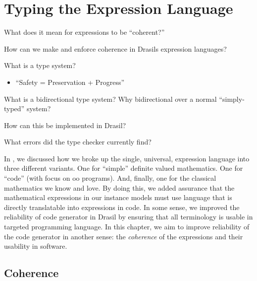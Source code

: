\chapter{Typing the Expression Language}
\label{chap:typedExpr}

\begin{writingdirectives}
      \item What does it mean for expressions to be ``coherent?''
      \item How can we make and enforce coherence in Drasils expression
            languages?
      \item What is a type system?
            \begin{itemize}
                  \item ``Safety = Preservation + Progress'' \cite{Harper2016}
            \end{itemize}
      \item What is a bidirectional type system? Why bidirectional over a normal
            ``simply-typed'' system?
      \item How can this be implemented in Drasil?
      \item What errors did the type checker currently find?
\end{writingdirectives}

In , we discussed how we broke up the single,
universal, expression language into three different variants. One for ``simple''
definite valued mathematics. One for ``code'' (with focus on \acs{oo} programs).
And, finally, one for the classical mathematics we know and love. By doing this,
we added assurance that the mathematical expressions in our instance models must
use language that is directly translatable into expressions in code. In some
sense, we improved the reliability of code generator in Drasil by ensuring that
all terminology is usable in targeted programming language. In this chapter, we
aim to improve reliability of the code generator in another sense: the
\textit{coherence} of the expressions and their usability in software.

\section{Coherence}
\label{chap:typedExpr:sec:coherence}

